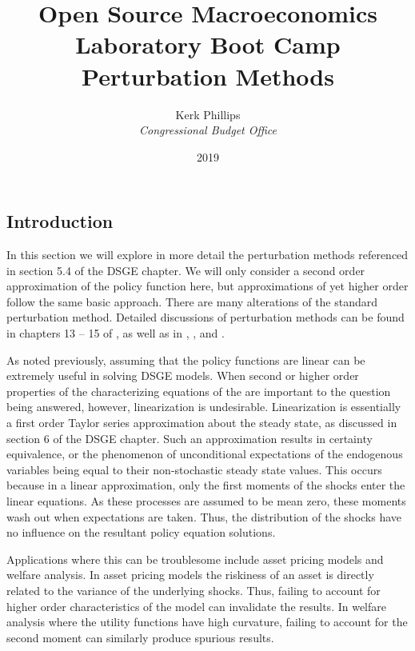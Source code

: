 \documentclass[letterpaper,12pt]{article}
\theoremstyle{definition}
\begin{document}
\begin{titlepage}
	\title{Open Source Macroeconomics Laboratory Boot Camp \\ Perturbation Methods}  %
	\author{Kerk Phillips\\ \emph{Congressional Budget Office}}
	\date{\LARGE{2019}}
	\maketitle
\end{titlepage}

\begin{spacing}{1.5}

\section{Introduction} \label{Perturb_Intro}
	In this section we will explore in more detail the perturbation methods referenced in section 5.4 of the DSGE chapter. We will only consider a second order approximation of the policy function here, but approximations of yet higher order follow the same basic approach. There are many alterations of the standard perturbation method. Detailed discussions of perturbation methods can be found in chapters  13 -- 15 of \citet{Judd1998}, as well as in \citet{CollardJuilliard2001}, \citet{SchmittGroheUribe2004}, and \citet{HeerMaussner2009}.

	As noted previously, assuming that the policy functions are linear can be extremely useful in solving DSGE models. When second or higher order properties of the characterizing equations of the are important to the question being answered, however, linearization is undesirable. Linearization is essentially a first order Taylor series approximation about the steady state, as discussed in section 6 of the DSGE chapter. Such an approximation results in certainty equivalence, or the phenomenon of unconditional expectations of the endogenous variables being equal to their non-stochastic steady state values. This occurs because in a linear approximation, only the first moments of the shocks enter the linear equations. As these processes are assumed to be mean zero, these moments wash out when expectations are taken. Thus, the distribution of the shocks have no influence on the resultant policy equation solutions. 

	Applications where this can be troublesome include asset pricing models and welfare analysis. In asset pricing models the riskiness of an asset is directly related to the variance of the underlying shocks. Thus, failing to account for higher order characteristics of the model can invalidate the results. In welfare analysis where the utility functions have high curvature, failing to account for the second moment can similarly produce spurious results.


\end{spacing}
\end{document}
